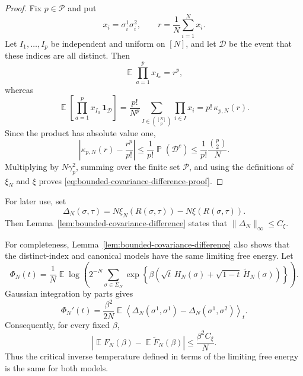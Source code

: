 \documentclass[letterpaper,11pt,reqno]{amsart}
\renewcommand{\leq}{\leqslant}
\newcommand{\cP}{\mathcal{P}}\newcommand{\cQ}{\mathcal{Q}}\newcommand{\cR}{\mathcal{R}}
\DeclareMathOperator{\E}{\mathds{E}}
\DeclareMathOperator{\pr}{\mathds{P}}
\begin{document}
\begin{proof}
Fix $p\in\cP$ and put
\[
x_i=\sigma_i^1\sigma_i^2,
\qquad
r=\frac1N\sum_{i=1}^N x_i.
\]
Let $I_1,\ldots,I_p$ be independent and uniform on $[N]$, and let
$\mathcal D$ be the event that these indices are all distinct. Then
\[
\E\prod_{a=1}^p x_{I_a}=r^p,
\]
whereas
\[
\E\left[
\prod_{a=1}^p x_{I_a}\,\mathbf 1_{\mathcal D}
\right]
=
\frac{p!}{N^p}
\sum_{I\in\binom{[N]}p}\prod_{i\in I}x_i
=
p!\,\kappa_{p,N}(r).
\]
Since the product has absolute value one,
\begin{equation}
\left|
\kappa_{p,N}(r)-\frac{r^p}{p!}
\right|
\leq
\frac1{p!}\pr(\mathcal D^c)
\leq
\frac1{p!}\frac{\binom p2}{N}.
\label{eq:kappa-covariance-comparison}
\end{equation}
Multiplying by $N\gamma_p^2$, summing over the finite set $\cP$, and
using the definitions of $\xi_N$ and $\xi$ proves
\eqref{eq:bounded-covariance-difference-proof}.
\end{proof}

For later use, set
\begin{equation}
\Delta_N(\sigma,\tau)
=
N\xi_N(R(\sigma,\tau))-N\xi(R(\sigma,\tau)).
\label{eq:Delta-N}
\end{equation}
Then Lemma~\ref{lem:bounded-covariance-difference} states that
$\|\Delta_N\|_\infty\leq C_\xi$.

For completeness, Lemma~\ref{lem:bounded-covariance-difference} also
shows that the distinct-index and canonical models have the same
limiting free energy. Let
\[
\Phi_N(t)
=
\frac1N\E\log\left(
2^{-N}\sum_{\sigma\in\Sigma_N}
\exp\left\{
\beta\left(\sqrt{t}\,H_N(\sigma)
+\sqrt{1-t}\,\widetilde H_N(\sigma)\right)
\right\}
\right).
\]
Gaussian integration by parts gives
\[
\Phi_N'(t)
=
\frac{\beta^2}{2N}
\E\left\langle
\Delta_N(\sigma^1,\sigma^1)
-\Delta_N(\sigma^1,\sigma^2)
\right\rangle_t.
\]
Consequently, for every fixed $\beta$,
\begin{equation}
\left|
\E F_N(\beta)-\E\widetilde F_N(\beta)
\right|
\leq
\frac{\beta^2 C_\xi}{N}.
\label{eq:free-energy-comparison}
\end{equation}
Thus the critical inverse temperature defined in terms of the limiting
free energy is the same for both models.
\end{document}
